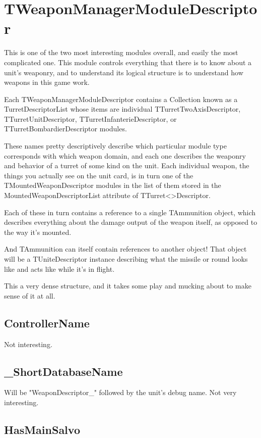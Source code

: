 \documentclass{article}
\begin{document}
\section{TWeaponManagerModuleDescriptor}

This is one of the two most interesting modules overall, and easily the most complicated one. This module controls everything that there is to know about a unit's weaponry, and to understand its logical structure is to understand how weapons in this game work.

Each TWeaponManagerModuleDescriptor contains a Collection known as a TurretDescriptorList whose items are individual TTurretTwoAxisDescriptor, TTurretUnitDescriptor, TTurretInfanterieDescriptor, or TTurretBombardierDescriptor modules.

These names pretty descriptively describe which particular module type corresponds with which weapon domain, and each one describes the weaponry and behavior of a turret of some kind on the unit. Each individual weapon, the things you actually see on the unit card, is in turn one of the TMountedWeaponDescriptor modules in the list of them stored in the MountedWeaponDescriptorList attribute of TTurret\textless *\textgreater Descriptor.

Each of these in turn contains a reference to a single TAmmunition object, which describes everything about the damage output of the weapon itself, as opposed to the way it's mounted.

And TAmmunition can itself contain references to another object! That object will be a TUniteDescriptor instance describing what the missile or round looks like and acts like while it's in flight.

This a very dense structure, and it takes some play and mucking about to make sense of it at all.

\subsection{ControllerName}

Not interesting.

\subsection{\_ShortDatabaseName}

Will be "WeaponDescriptor\_" followed by the unit's debug name. Not very interesting.

\subsection{HasMainSalvo}
\end{document}
